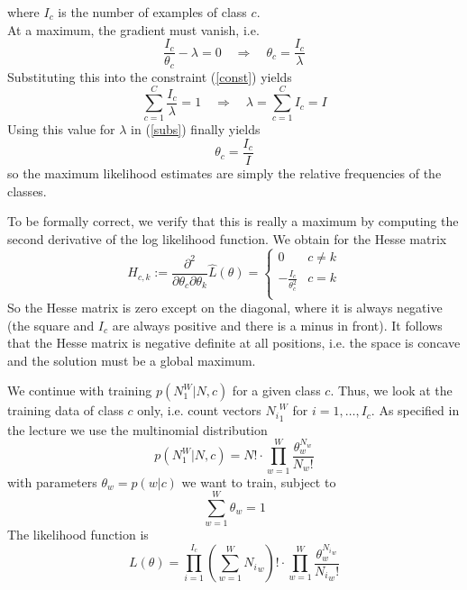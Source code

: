 \documentclass[%
   11pt,              %
   ngerman,           %
   a4paper,           %
   DIV11,             %
]{scrartcl}%
\begin{document}
where $I_c$ is the number of examples of class $c$. \\
At a maximum, the gradient must vanish, i.e.
\begin{equation}\label{subs}
	\frac{I_c}{\theta_c} - \lambda = 0 \quad \Rightarrow \quad \theta_c = \frac{I_c}{\lambda}
\end{equation}
Substituting this into the constraint (\ref{const}) yields
\begin{equation*}
	\sum_{c=1}^C \frac{I_c}{\lambda} = 1 \quad \Rightarrow \quad \lambda = \sum_{c=1}^C I_c = I
\end{equation*}
Using this value for $\lambda$ in (\ref{subs}) finally yields
\begin{equation*}
	\theta_c = \frac{I_c}{I}
\end{equation*}
so the maximum likelihood estimates are simply the relative frequencies of the classes. \par
To be formally correct, we verify that this is really a maximum by computing the second derivative of the log likelihood function. We obtain for the Hesse matrix
\begin{equation*}
	H_{c,k} := \frac{\partial^2}{\partial \theta_c \partial \theta_k} \hat{L}(\theta) = \begin{cases}
	0 & c \neq k \\
	- \frac{I_c}{\theta_c^2} & c = k \\ \end{cases}
\end{equation*}
So the Hesse matrix is zero except on the diagonal, where it is always negative (the square and $I_c$ are always positive and there is a minus in front). It follows that the Hesse matrix is negative definite at all positions, i.e. the space is concave and the solution must be a global maximum. \par
We continue with training $p(N_1^W|N,c)$ for a given class $c$. Thus, we look at the training data of class $c$ only, i.e. count vectors ${N_i}_1^W$ for $i = 1,\ldots,I_c$. As specified in the lecture we use the multinomial distribution
\begin{equation*}
	p(N_1^W|N,c) = N! \cdot \prod_{w=1}^W \frac{\theta_w^{N_w}}{N_w !}
\end{equation*}
with parameters $\theta_w = p(w|c)$ we want to train, subject to
\begin{equation}\label{cons2}
	\sum_{w=1}^W \theta_w = 1
\end{equation}
The likelihood function is 
\begin{equation*}
	L(\theta) = \prod_{i=1}^{I_c} (\sum_{w=1}^W {N_i}_w)! \cdot \prod_{w=1}^W \frac{\theta_w^{{N_i}_w}}{{N_i}_w !}
\end{equation*}
\end{document}
